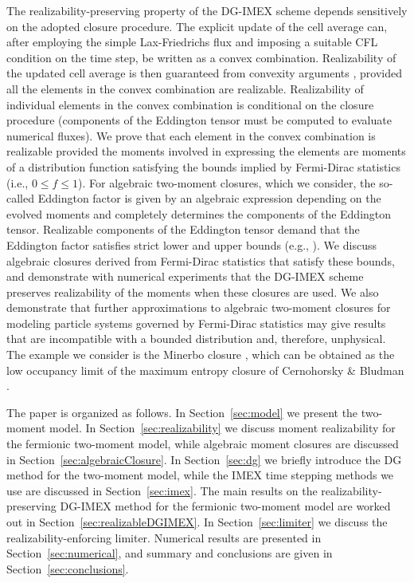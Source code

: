 The realizability-preserving property of the DG-IMEX scheme depends sensitively on the adopted closure procedure.  
The explicit update of the cell average can, after employing the simple Lax-Friedrichs flux and imposing a suitable CFL condition on the time step, be written as a convex combination.  
Realizability of the updated cell average is then guaranteed from convexity arguments \cite{zhangShu_2010a}, provided all the elements in the convex combination are realizable.  
Realizability of individual elements in the convex combination is conditional on the closure procedure (components of the Eddington tensor must be computed to evaluate numerical fluxes).  
We prove that each element in the convex combination is realizable provided the moments involved in expressing the elements are moments of a distribution function satisfying the bounds implied by Fermi-Dirac statistics (i.e., $0\le f \le 1$).  
For algebraic two-moment closures, which we consider, the so-called Eddington factor is given by an algebraic expression depending on the evolved moments and completely determines the components of the Eddington tensor.  
Realizable components of the Eddington tensor demand that the Eddington factor satisfies strict lower and upper bounds (e.g., \cite{levermore_1984,lareckiBanach_2011}).  
We discuss algebraic closures derived from Fermi-Dirac statistics that satisfy these bounds, and demonstrate with numerical experiments that the DG-IMEX scheme preserves realizability of the moments when these closures are used.  
We also demonstrate that further approximations to algebraic two-moment closures for modeling particle systems governed by Fermi-Dirac statistics may give results that are incompatible with a bounded distribution and, therefore, unphysical.  
The example we consider is the Minerbo closure \cite{minerbo_1978}, which can be obtained as the low occupancy limit of the maximum entropy closure of Cernohorsky \& Bludman \cite{cernohorskyBludman_1994}.  

The paper is organized as follows.  
In Section~\ref{sec:model} we present the two-moment model.  
In Section~\ref{sec:realizability} we discuss moment realizability for the fermionic two-moment model, while algebraic moment closures are discussed in Section~\ref{sec:algebraicClosure}.  
In Section~\ref{sec:dg} we briefly introduce the DG method for the two-moment model, while the IMEX time stepping methods we use are discussed in Section~\ref{sec:imex}.  
The main results on the realizability-preserving DG-IMEX method for the fermionic two-moment model are worked out in Section~\ref{sec:realizableDGIMEX}.  
In Section~\ref{sec:limiter} we discuss the realizability-enforcing limiter.  
Numerical results are presented in Section~\ref{sec:numerical}, and summary and conclusions are given in Section~\ref{sec:conclusions}.  
